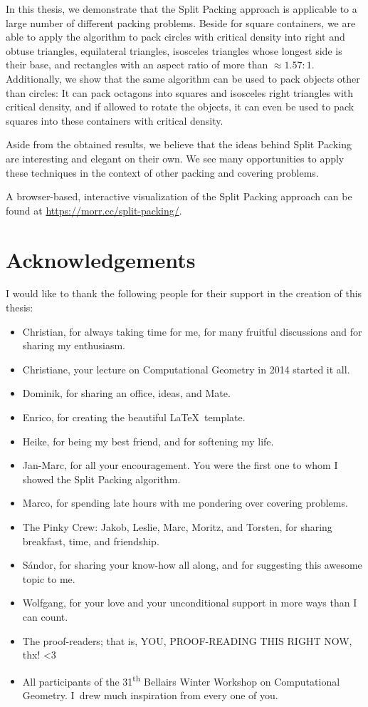 \documentclass[a4paper,style=print,bibliography=totoc,nexus,lnum,extramargin]{tubsbook}
\begin{document}
In this thesis, we demonstrate that the Split Packing approach is applicable to a large number of different packing problems.
Beside for square containers, we are able to apply the algorithm to pack circles with critical density into
right and obtuse triangles,
equilateral triangles,
isosceles triangles whose longest side is their base,
and rectangles with an aspect ratio of more than $\approx \! 1.57:1$.
Additionally, we show that the same algorithm can be used to pack objects other than circles: It can pack octagons into squares and isosceles right triangles with critical density, and if allowed to rotate the objects, it can even be used to pack squares into these containers with critical density.

Aside from the obtained results, we believe that the ideas behind Split Packing are interesting and elegant on their own. We see many opportunities to apply these techniques in the context of other packing and covering problems.

A browser-based, interactive visualization of the Split Packing approach can be found at \url{https://morr.cc/split-packing/}.

\cleardoublepage

\section*{Acknowledgements}

I would like to thank the following people for their support in the creation of this thesis:

\begin{itemize}
    \item Christian, for always taking time for me, for many fruitful discussions and for sharing my enthusiasm.
    \item Christiane, your lecture on Computational Geometry in 2014 started it all.
    \item Dominik, for sharing an office, ideas, and Mate.
    \item Enrico, for creating the beautiful \LaTeX\ template.
    \item Heike, for being my best friend, and for softening my life.
    \item Jan-Marc, for all your encouragement. You were the first one to whom I showed the Split Packing algorithm.
    \item Marco, for spending late hours with me pondering over covering problems.
    \item The Pinky Crew: Jakob, Leslie, Marc, Moritz, and Torsten, for sharing breakfast, time, and friendship.
    \item Sándor, for sharing your know-how all along, and for suggesting this awesome topic to me.
    \item Wolfgang, for your love and your unconditional support in more ways than I can count.
    \item The proof-readers; that is, YOU, PROOF-READING THIS RIGHT NOW, thx! <3
    \item All participants of the 31\textsuperscript{th} Bellairs Winter Workshop on Computational Geometry. I~drew much inspiration from every one of you.
\end{itemize}
\end{document}
